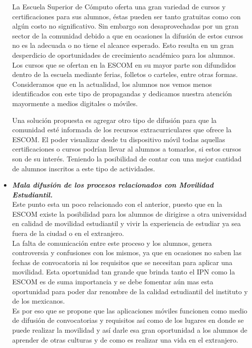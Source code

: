 \begin{itemize}
		La Escuela Superior de Cómputo oferta una gran variedad de cursos y certificaciones para sus alumnos, éstas pueden ser tanto gratuitas como con algún costo no significativo. Sin embargo son desaprovechadas por un gran sector de la comunidad debido a que en ocasiones la difusión de estos cursos no es la adecuada o no tiene el alcance esperado. Esto resulta en un gran desperdicio de oportunidades de crecimiento académico para los alumnos.\\
		
		Los cursos que se ofertan en la ESCOM en su mayor parte son difundidos dentro de la escuela mediante ferias, folletos o carteles, entre otras formas. Consideramos que en la actualidad, los alumnos nos vemos menos identificados con este tipo de propagandas y dedicamos nuestra atención mayormente a medios digitales o móviles.
		
		Una solución propuesta es agregar otro tipo de difusión para que la comunidad esté informada de los recursos extracurriculares que ofrece la ESCOM. El poder visualizar desde tu dispositivo móvil todas aquellas certificaciones o cursos podrían llevar al alumnos a tomarlos, si estos cursos son de su interés. Teniendo la posibilidad de contar con una mejor cantidad de alumnos inscritos a este tipo de actividades.\\ 
		
		
		
		\item \textbf{\textit{Mala difusión de los procesos relacionados con Movilidad Estudiantil.}}\\
		
		Este punto esta un poco relacionado con el anterior, puesto que en la ESCOM existe la posibilidad para los alumnos de dirigirse a otra universidad en calidad de movilidad estudiantil y vivir la experiencia de estudiar ya sea fuera de la ciudad o en el extranjero. \\
		
		La falta de comunicación entre este proceso y los alumnos, genera controversia y confusiones con los mismos, ya que en ocasiones no saben las fechas de convocatoria ni los requisitos que se necesitan para aplicar una movilidad. Esta oportunidad tan grande que brinda tanto el IPN como la ESCOM es de suma importancia y se debe fomentar aún mas esta oportunidad para poder dar renombre de la calidad estudiantil del instituto y de los mexicanos.\\
		
		Es por eso que se propone que las aplicaciones móviles funcionen como medio de difusión de convocatorias y requisitos así como de los lugares en donde se puede realizar la movilidad y así darle esa gran oportunidad a los alumnos de aprender de otras culturas y de como es realizar una vida en el extranjero.\\
		
	\end{itemize}
	
